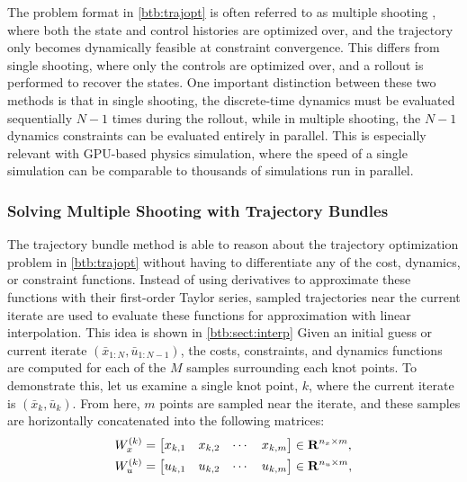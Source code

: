 The problem format in \eqref{btb:trajopt} is often referred to as multiple shooting \cite{hargraves1987, betts2001}, where both the state and control histories are optimized over, and the trajectory only becomes dynamically feasible at constraint convergence. This differs from single shooting, where only the controls are optimized over, and a rollout is performed to recover the states. One important distinction between these two methods is that in single shooting, the discrete-time dynamics must be evaluated sequentially $N-1$ times during the rollout, while in multiple shooting, the $N-1$ dynamics constraints can be evaluated entirely in parallel. This is especially relevant with GPU-based physics simulation, where the speed of a single simulation can be comparable to thousands of simulations run in parallel. 

\subsubsection{Solving Multiple Shooting with Trajectory Bundles}
The trajectory bundle method is able to reason about the trajectory optimization problem in \eqref{btb:trajopt} without having to differentiate any of the cost, dynamics, or constraint functions. Instead of using derivatives to approximate these functions with their first-order Taylor series, sampled trajectories near the current iterate are used to evaluate these functions for approximation with linear interpolation. This idea is shown in \ref{btb:sect:interp}
Given an initial guess or current iterate $(\bar{x}_{1:N}, \bar{u}_{1:N-1})$, the costs, constraints, and dynamics functions are computed for each of the $M$ samples surrounding each knot points. To demonstrate this, let us examine a single knot point, $k$, where the current iterate is $(\bar{x}_k, \bar{u}_k)$. From here, $m$ points are sampled near the iterate, and these samples are horizontally concatenated into the following matrices:
\begin{align}
    W_x^{(k)} &= \begin{bmatrix}
        x_{k,1} & x_{k,2} & \cdots & x_{k,m}
    \end{bmatrix} \in \mathbf{R}^{n_x \times m}, \label{btb:Wx}\\
    W_u^{(k)} &= \begin{bmatrix}
        u_{k,1} & u_{k,2} & \cdots & u_{k,m}
    \end{bmatrix} \in \mathbf{R}^{n_u \times m}, \label{btb:Wu}
\end{align}
